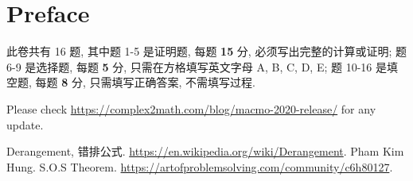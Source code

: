 \documentclass[10pt]{article}
\begin{document}


{}
\section*{Preface}

此卷共有 16 题, 其中题 1-5 是证明题, 每题 \textbf{15} 分,
必须写出完整的计算或证明; 题 6-9 是选择题, 每题 \textbf{5} 分,
只需在方格填写英文字母 A, B, C, D, E; 题 10-16 是填空题,
每题 \textbf{8} 分, 只需填写正确答案, 不需填写过程.

\bigskip

Please check \url{https://complex2math.com/blog/macmo-2020-release/} for any update.

\newpage

































\newpage

{}
\begin{thebibliography}{99}
Derangement, 错排公式.
\url{https://en.wikipedia.org/wiki/Derangement}.
Pham Kim Hung.
S.O.S Theorem.
\url{https://artofproblemsolving.com/community/c6h80127}.
\end{thebibliography}
\end{document}
